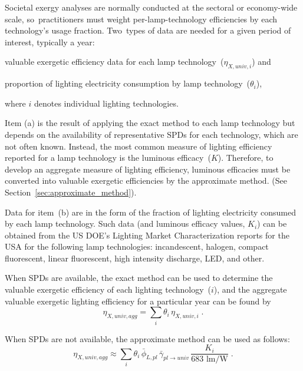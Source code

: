 \documentclass[energies,article,accept,moreauthors,pdftex]{Definitions/mdpi}\usepackage[]{graphicx}\usepackage[]{color}
\newcommand{\gammaratavg}{\bar{\gamma}_{pl\rightarrow{}univ}}
\begin{document}
Societal exergy analyses are normally conducted at the sectoral or economy-wide scale, 
\mbox{so practitioners} must weight per-lamp-technology efficiencies
by each technology's usage fraction.
\mbox{Two types} of data are needed for a given period of interest, typically a year:
%
\begin{enumerate*}[label={(\alph*)}]

  \item valuable exergetic efficiency data for each lamp technology~($\eta_{X,univ,i}$) and

  \item proportion of lighting electricity consumption by lamp technology~($\theta_i$),

\end{enumerate*}
%
where $i$ denotes individual lighting technologies.

Item (a) is the result of applying the exact method to each lamp technology
but depends on the availability of representative SPDs for each technology,
which are not often known.
Instead, the most common measure of lighting efficiency 
reported for a lamp technology is the luminous efficacy~($K$).
Therefore, to develop an aggregate measure of lighting efficiency, 
luminous efficacies must be converted 
into valuable exergetic efficiencies by the approximate method.
(See Section~\ref{sec:approximate_method}).

Data for item~(b) are in the form of the fraction of lighting electricity consumed by each lamp technology.
Such data (and luminous efficacy values, $K_i$)
can be obtained from the US DOE's Lighting Market Characterization reports \citep{DOE2002, DOE2012, DOE2017}
for the USA for the following lamp technologies: incandescent, halogen, compact fluorescent,
linear fluorescent, high intensity discharge, LED, and other.

When SPDs are available, the exact method can be used to determine the 
valuable exergetic efficiency of each lighting technology~($i$), and
the aggregate valuable exergetic lighting efficiency for a particular year can be found by
\begin{equation} \label{eq:agg_eta}
  \eta_{X,univ,agg} = \sum \limits_{i} \theta_{i} \, \eta_{X,univ,i} \; .
\end{equation}
%

When SPDs are not available, the approximate method can be used as follows:
\begin{equation} \label{eq:agg_eta_K}
  \eta_{X,univ,agg} \approx \sum \limits_{i} \theta_{i} \, \bar{\phi}_{L,pl} \, \gammaratavg{} \, 
                            \frac{K_{i}}{683 \text{ lm/W}} \; .
\end{equation}
\end{document}
